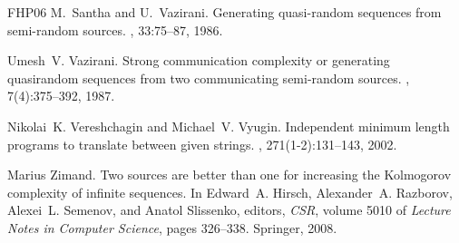 \documentclass[proceedings]{stacs}
\begin{document}
\begin{thebibliography}{FHP{\etalchar{+}}06}
M.~Santha and U.~Vazirani.
\newblock Generating quasi-random sequences from semi-random sources.
, 33:75--87, 1986.

Umesh~V. Vazirani.
\newblock Strong communication complexity or generating quasirandom sequences
  from two communicating semi-random sources.
, 7(4):375--392, 1987.

Nikolai~K. Vereshchagin and Michael~V. Vyugin.
\newblock Independent minimum length programs to translate between given
  strings.
, 271(1-2):131--143, 2002.

Marius Zimand.
\newblock Two sources are better than one for increasing the {K}olmogorov
  complexity of infinite sequences.
\newblock In Edward~A. Hirsch, Alexander~A. Razborov, Alexei~L. Semenov, and
  Anatol Slissenko, editors, {\em CSR}, volume 5010 of {\em Lecture Notes in
  Computer Science}, pages 326--338. Springer, 2008.

\end{thebibliography}





%

%
\end{document}
